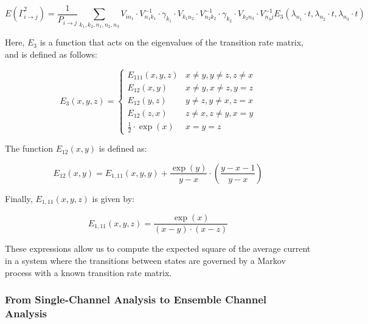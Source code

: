 \documentclass[pdflatex,sn-mathphys-num]{sn-jnl}%
\theoremstyle{thmstyleone}%
\theoremstyle{thmstyletwo}%
\theoremstyle{thmstylethree}%
\begin{document}
\begin{equation}
	E(\overline{\Gamma}_{i \rightarrow j}^2) = \frac{1}{P_{i \rightarrow j}} \sum_{k_1, k_2, n_1, n_2, n_3} V_{i n_1} \cdot V^{-1}_{n_1 k_1} \cdot \gamma_{k_1} \cdot V_{k_1 n_2} \cdot V^{-1}_{n_2 k_2} \cdot \gamma_{k_2} \cdot V_{k_2 n_3} \cdot V^{-1}_{n_3 j} E_3(\lambda_{n_1} \cdot t, \lambda_{n_2} \cdot t, \lambda_{n_3} \cdot t)
	\label{eq:sqr_gamma_formula}
\end{equation}

Here, \(E_3\) is a function that acts on the eigenvalues of the transition rate matrix, and is defined as follows:

\begin{equation}
	E_3(x,y,z)= 
	\begin{cases}
		E_{111}(x,y,z) & x\neq y, y\neq z, z\neq x \\
		E_{12}(x,y) & x\neq y, x\neq z, y = z \\
		E_{12}(y,z) & y\neq z, y\neq x, z = x \\
		E_{12}(z,x) & z\neq x, z\neq y, x = y \\
		\frac{1}{2} \cdot \exp(x) & x=y=z
	\end{cases}
	\label{eq:E_3}
\end{equation}

The function \(E_{12}(x, y)\) is defined as:

\begin{equation}
	E_{12}(x,y) = E_{1,11}(x, y, y) + \frac{\exp(y)}{y - x} \cdot \left(\frac{y - x - 1}{y - x}\right)
	\label{eq:E_12}
\end{equation}

Finally, \(E_{1,11}(x, y, z)\) is given by:

\begin{equation}
	E_{1,11}(x, y, z) = \frac{\exp(x)}{(x - y) \cdot (x - z)}
	\label{eq:E_1_11}
\end{equation}

These expressions allow us to compute the expected square of the average current in a system where the transitions between states are governed by a Markov process with a known transition rate matrix.






\subsubsection{From Single-Channel Analysis to Ensemble Channel Analysis}
\end{document}
